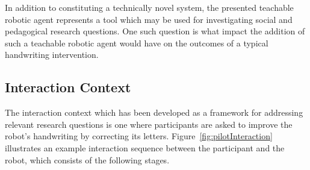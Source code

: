 \documentclass{sig-alternate}
\begin{document}
In addition to constituting a technically novel system, the presented teachable
robotic agent represents a tool which may be used for investigating social and
pedagogical research questions. One such question is what impact the addition of
such a teachable robotic agent would have on the outcomes of a typical
handwriting intervention. 

\subsection{Interaction Context}

The interaction context which has been developed as a framework for addressing
relevant research questions is one where participants are asked to improve the robot's
handwriting by correcting its letters. Figure~\ref{fig:pilotInteraction}
illustrates an example interaction sequence between the participant and the
robot, which consists of the following stages.
\end{document}
